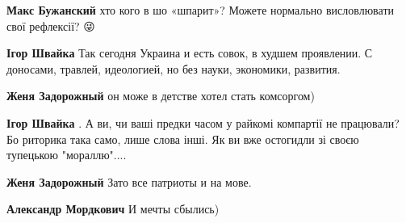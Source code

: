 \begin{itemize}
\begin{itemize}
\textbf{Макс Бужанский} хто кого в шо «шпарит»?
Можете нормально висловлювати свої рефлексії? 😜

 
\textbf{Ігор Швайка} Так сегодня Украина и есть совок, в худшем проявлении. С доносами, травлей, идеологией, но без науки, экономики, развития.

 
\textbf{Женя Задорожный} он може в детстве хотел стать комсоргом)

 
\textbf{Ігор Швайка} . А ви, чи ваші предки часом у райкомі компартії не працювали? Бо риторика така само, лише слова інші. Як ви вже остогидли зі своєю тупецькою "мораллю"....

 
\textbf{Женя Задорожный} Зато все патриоты и на мове.

 
\textbf{Александр Мордкович} И мечты сбылись)

 

\end{itemize}
\end{itemize}
